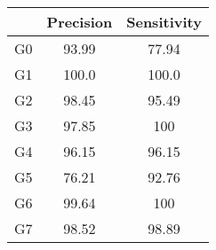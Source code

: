 \begin{longtable}{ccc}
\caption{}
\label{tab:my-table}\\
\hline
   & Precision & Sensitivity \\ \hline
\endfirsthead
%
\endhead
%
G0 & 93.99     & 77.94       \\ \cline{1-1}
G1 & 100.0     & 100.0       \\ \cline{1-1}
G2 & 98.45     & 95.49       \\ \cline{1-1}
G3 & 97.85     & 100         \\ \cline{1-1}
G4 & 96.15     & 96.15       \\ \cline{1-1}
G5 & 76.21     & 92.76       \\ \cline{1-1}
G6 & 99.64     & 100         \\ \cline{1-1}
G7 & 98.52     & 98.89       \\ \hline
\end{longtable}